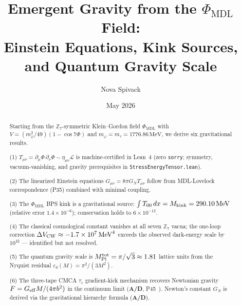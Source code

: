\documentclass[11pt]{article}
\theoremstyle{remark}
\newcommand{\PHIMDL}{\Phi_{\mathrm{MDL}}}
\newcommand{\ZS}{\mathbb{Z}_7}
\newcommand{\lean}[1]{%
  \penalty-100
  \begingroup\def\_{\textunderscore\allowbreak}\texttt{#1}\endgroup}
\newcommand{\CatAD}{\textbf{A/D}}
\begin{document}
\title{\textbf{Emergent Gravity from the $\PHIMDL$ Field:\\
  Einstein Equations, Kink Sources, and Quantum Gravity Scale}}

\author{Nova Spivack}
\date{May 2026}
\maketitle

\NovaZenodoAfterTitle

\begin{abstract}
Starting from the $\ZS$-symmetric Klein--Gordon field $\PHIMDL$ with
$V = (m_\varphi^2/49)(1-\cos 7\Phi)$ and $m_\varphi = m_\tau = 1776.86\,\text{MeV}$,
we derive six gravitational results.

(1) $T_{\mu\nu} = \partial_\mu\Phi\,\partial_\nu\Phi - \eta_{\mu\nu}\mathcal{L}$ is
machine-certified in Lean~4 (zero \texttt{sorry}; symmetry, vacuum-vanishing, and gravity prerequisites in \lean{StressEnergyTensor.lean}).

(2) The linearized Einstein equations $G_{\mu\nu} = 8\pi G_N T_{\mu\nu}$ follow
from MDL-Lovelock correspondence (P35) combined with minimal coupling.

(3) The $\PHIMDL$ BPS kink is a gravitational source: $\int T_{00}\,dx = M_{\rm kink}
= 290.10\,\text{MeV}$ (relative error $1.4\times10^{-6}$); conservation holds to
$6\times10^{-12}$.

(4) The classical cosmological constant vanishes at all seven $\ZS$ vacua; the
one-loop correction $\Delta V_{\rm CW} \approx -1.7\times10^7\,\text{MeV}^4$
exceeds the observed dark-energy scale by $10^{42}$ — identified but not resolved.

(5) The quantum gravity scale is $M_{\rm Pl}^{\rm tot} = \pi/\sqrt{3} \approx 1.81$
lattice units from the Nyquist residual $\varepsilon_0(M) = \pi^2/(3M^2)$.

(6) The three-tape CMCA $\tau_c$ gradient-kick mechanism recovers Newtonian gravity
$F = G_{\rm eff}M/(4\pi b^2)$ in the continuum limit (\CatAD, P45~\cite{SpivackCMCA}).
Newton's constant $G_N$ is derived via the gravitational hierarchy formula (\CatAD).
\end{abstract}

\tableofcontents
\newpage
\end{document}
